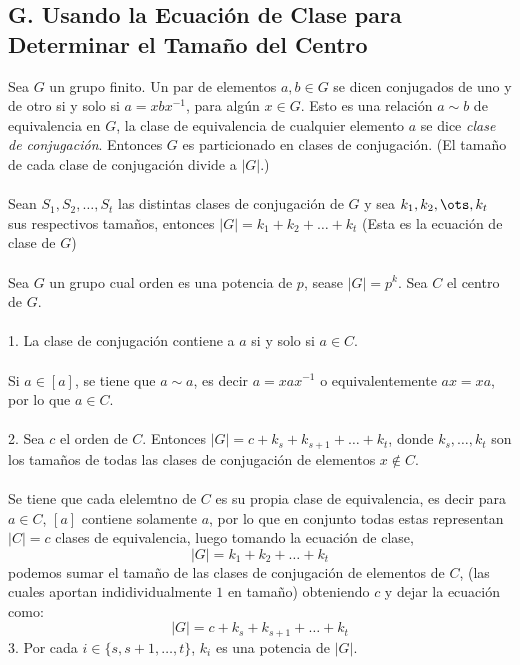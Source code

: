 \documentclass{article}
\begin{document}
\subsection*{G. Usando la Ecuación de Clase para Determinar el Tamaño del Centro}
Sea $G$ un grupo finito. Un par de elementos $a,b \in G$ se dicen conjugados de uno y de otro si y solo si $a=xbx^{-1}$, para algún $x \in G$. Esto es una relación $a \sim b$ de equivalencia en $G$, la clase de equivalencia de cualquier elemento $a$ se dice \textit{clase de conjugación}. Entonces $G$ es particionado en clases de conjugación. (El tamaño de cada clase de conjugación divide a $|G|$.)
\\
\\
Sean $S_1, S_2,\dots,S_t$ las distintas clases de conjugación de $G$ y sea $k_1,k_2, \ots, k_t$ sus respectivos tamaños, entonces $|G|=k_1+k_2+\dots+k_t$ (Esta es la ecuación de clase de $G$)
\\
\\
Sea $G$ un grupo cual orden es una potencia de $p$, sease $|G|=p^{k}$. Sea $C$ el centro de $G$.
\\
\\
1. La clase de conjugación contiene a $a$ si y solo si $a \in C$.
\\
\\
Si $a \in [a]$, se tiene que $a \sim a$, es decir $a=xax^{-1}$ o equivalentemente $ax=xa$, por lo que $a \in C$.
\\
\\
2. Sea $c$ el orden de $C$. Entonces $|G|=c+k_s+k_{s+1}+\dots+k_t$, donde $k_{s},\dots,k_t$ son los tamaños de todas las clases de conjugación de elementos $x \notin C$.
\\
\\
Se tiene que cada elelemtno de $C$ es su propia clase de equivalencia, es decir para $a \in C$, $[a]$ contiene solamente $a$, por lo que en conjunto todas estas representan $|C|=c$ clases de equivalencia, luego tomando la ecuación de clase,
\begin{equation*}
    |G|=k_1+k_2+\dots+k_t
\end{equation*}
podemos sumar el tamaño de las clases de conjugación de elementos de $C$, (las cuales aportan indidividualmente $1$ en tamaño) obteniendo $c$ y dejar la ecuación como:
\begin{equation*}
    |G|=c+k_{s}+k_{s+1}+\dots+k_t
\end{equation*}
3. Por cada $i \in \{s,s+1,\dots,t \}$, $k_i$ es una potencia de $|G|$.
\\
\end{document}

